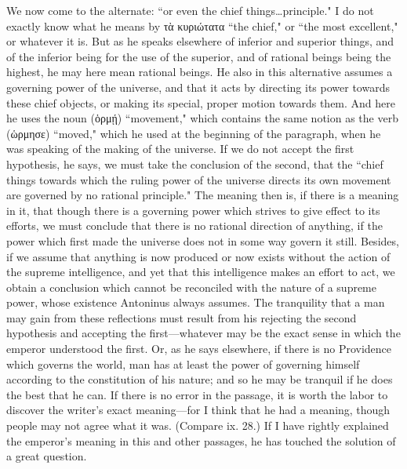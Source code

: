 \begin{enumerate}
{We now come to the alternate: ``or even the chief things\ldots principle." I do not exactly know what he means by \textgreek{τὰ κυριώτατα} ``the chief," or ``the most excellent," or whatever it is. But as he speaks elsewhere of inferior and superior things, and of the inferior being for the use of the superior, and of rational beings being the highest, he may here mean rational beings. He also in this alternative assumes a governing power of the universe, and that it acts by directing its power towards these chief objects, or making its special, proper motion towards them. And here he uses the noun (\textgreek{ὁρμῄ}) ``movement," which contains the same notion as the verb (\textgreek{ὡρμησε}) ``moved," which he used at the beginning of the paragraph, when he was speaking of the making of the universe. If we do not accept the first hypothesis, he says, we must take the conclusion of the second, that the ``chief things towards which the ruling power of the universe directs its own movement are governed by no rational principle." The meaning then is, if there is a meaning in it, that though there is a governing power which strives to give effect to its efforts, we must conclude that there is no rational direction of anything, if the power which first made the universe does not in some way govern it still. Besides, if we assume that anything is now produced or now exists without the action of the supreme intelligence, and yet that this intelligence makes an effort to act, we obtain a conclusion which cannot be reconciled with the nature of a supreme power, whose existence Antoninus always assumes. The tranquility that a man may gain from these reflections must result from his rejecting the second hypothesis and accepting the first—whatever may be the exact sense in which the emperor understood the first. Or, as he says elsewhere, if there is no Providence which governs the world, man has at least the power of governing himself according to the constitution of his nature; and so he may be tranquil if he does the best that he can.
If there is no error in the passage, it is worth the labor to discover the writer's exact meaning—for I think that he had a meaning, though people may not agree what it was. (Compare ix. 28.) If I have rightly explained the emperor's meaning in this and other passages, he has touched the solution of a great question.}
\end{enumerate}